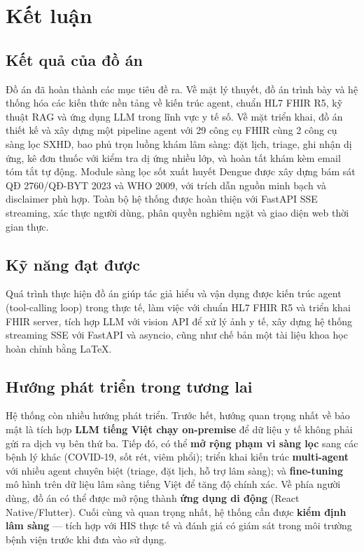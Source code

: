 \documentclass[a4paper,13pt,3p,oneside]{report}
\theoremstyle{definition}
\theoremstyle{remark}
\theoremstyle{definition}
\begin{document}
\chapter*{Kết luận}

\section*{Kết quả của đồ án}

Đồ án đã hoàn thành các mục tiêu đề ra. Về mặt lý thuyết, đồ án trình bày và hệ thống hóa các kiến thức nền tảng về kiến trúc agent, chuẩn HL7 FHIR R5, kỹ thuật RAG và ứng dụng LLM trong lĩnh vực y tế số. Về mặt triển khai, đồ án thiết kế và xây dựng một pipeline agent với 29 công cụ FHIR cùng 2 công cụ sàng lọc SXHD, bao phủ trọn luồng khám lâm sàng: đặt lịch, triage, ghi nhận dị ứng, kê đơn thuốc với kiểm tra dị ứng nhiều lớp, và hoàn tất khám kèm email tóm tắt tự động. Module sàng lọc sốt xuất huyết Dengue được xây dựng bám sát QĐ 2760/QĐ-BYT 2023 và WHO 2009, với trích dẫn nguồn minh bạch và disclaimer phù hợp. Toàn bộ hệ thống được hoàn thiện với FastAPI SSE streaming, xác thực người dùng, phân quyền nghiêm ngặt và giao diện web thời gian thực.

\section*{Kỹ năng đạt được}

Quá trình thực hiện đồ án giúp tác giả hiểu và vận dụng được kiến trúc agent (tool-calling loop) trong thực tế, làm việc với chuẩn HL7 FHIR R5 và triển khai FHIR server, tích hợp LLM với vision API để xử lý ảnh y tế, xây dựng hệ thống streaming SSE với FastAPI và asyncio, cũng như chế bản một tài liệu khoa học hoàn chỉnh bằng \LaTeX.

\section*{Hướng phát triển trong tương lai}

Hệ thống còn nhiều hướng phát triển. Trước hết, hướng quan trọng nhất về bảo mật là tích hợp \textbf{LLM tiếng Việt chạy on-premise} để dữ liệu y tế không phải gửi ra dịch vụ bên thứ ba. Tiếp đó, có thể \textbf{mở rộng phạm vi sàng lọc} sang các bệnh lý khác (COVID-19, sốt rét, viêm phổi); triển khai kiến trúc \textbf{multi-agent} với nhiều agent chuyên biệt (triage, đặt lịch, hỗ trợ lâm sàng); và \textbf{fine-tuning} mô hình trên dữ liệu lâm sàng tiếng Việt để tăng độ chính xác. Về phía người dùng, đồ án có thể được mở rộng thành \textbf{ứng dụng di động} (React Native/Flutter). Cuối cùng và quan trọng nhất, hệ thống cần được \textbf{kiểm định lâm sàng} --- tích hợp với HIS thực tế và đánh giá có giám sát trong môi trường bệnh viện trước khi đưa vào sử dụng.
\end{document}
